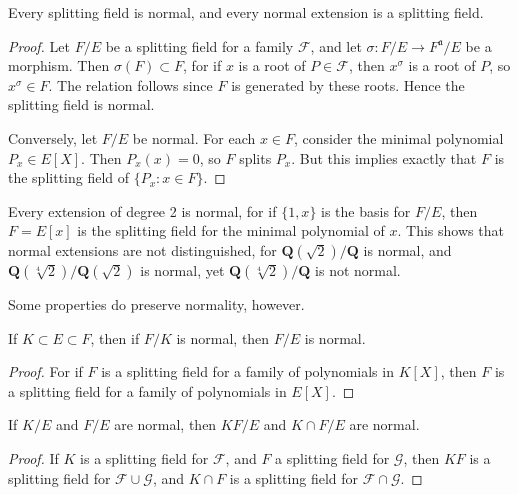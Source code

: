 \begin{corollary}
    Every splitting field is normal, and every normal extension is a splitting field.
\end{corollary}
\begin{proof}
    Let $F/E$ be a splitting field for a family $\mathcal{F}$, and let $\sigma: F/E \to F^{\mathfrak{a}}/E$ be a morphism. Then $\sigma(F) \subset F$, for if $x$ is a root of $P \in \mathcal{F}$, then $x^\sigma$ is a root of $P$, so $x^\sigma \in F$. The relation follows since $F$ is generated by these roots. Hence the splitting field is normal.

    Conversely, let $F/E$ be normal. For each $x \in F$, consider the minimal polynomial $P_x \in E[X]$. Then $P_x(x) = 0$, so $F$ splits $P_x$. But this implies exactly that $F$ is the splitting field of $\{ P_x : x \in F \}$.
\end{proof}

\begin{example}
    Every extension of degree 2 is normal, for if $\{ 1, x \}$ is the basis for $F/E$, then $F = E[x]$ is the splitting field for the minimal polynomial of $x$. This shows that normal extensions are not distinguished, for $\mathbf{Q}(\sqrt{2})/\mathbf{Q}$ is normal, and $\mathbf{Q}(\sqrt[4]{2})/\mathbf{Q}(\sqrt{2})$ is normal, yet $\mathbf{Q}(\sqrt[4]{2})/\mathbf{Q}$ is not normal.
\end{example}

Some properties do preserve normality, however.

\begin{theorem}
    If $K \subset E \subset F$, then if $F/K$ is normal, then $F/E$ is normal.
\end{theorem}
\begin{proof}
    For if $F$ is a splitting field for a family of polynomials in $K[X]$, then $F$ is a splitting field for a family of polynomials in $E[X]$.
\end{proof}

\begin{theorem}
    If $K/E$ and $F/E$ are normal, then $KF/E$ and $K \cap F / E$ are normal.
\end{theorem}
\begin{proof}
    If $K$ is a splitting field for $\mathcal{F}$, and $F$ a splitting field for $\mathcal{G}$, then $KF$ is a splitting field for $\mathcal{F} \cup \mathcal{G}$, and $K \cap F$ is a splitting field for $\mathcal{F} \cap \mathcal{G}$.
\end{proof}










